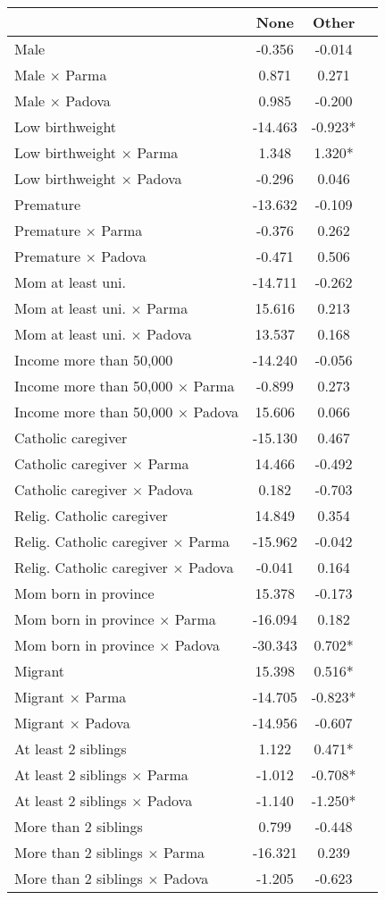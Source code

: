 \begin{tabular}{l c c c}
\toprule
& None & Other \\
\midrule
Male &    -0.356 &    -0.014 \\
Male $\times$ Parma &     0.871 &     0.271 \\
Male $\times$ Padova &     0.985 &    -0.200 \\
Low birthweight &   -14.463 & -0.923* \\
Low birthweight $\times$ Parma &     1.348 & 1.320* \\
Low birthweight $\times$ Padova &    -0.296 &     0.046 \\
Premature &   -13.632 &    -0.109 \\
Premature $\times$ Parma &    -0.376 &     0.262 \\
Premature $\times$ Padova &    -0.471 &     0.506 \\
Mom at least uni. &   -14.711 &    -0.262 \\
Mom at least uni. $\times$ Parma &    15.616 &     0.213 \\
Mom at least uni. $\times$ Padova &    13.537 &     0.168 \\
Income more than 50,000 &   -14.240 &    -0.056 \\
Income more than 50,000 $\times$ Parma &    -0.899 &     0.273 \\
Income more than 50,000 $\times$ Padova &    15.606 &     0.066 \\
Catholic caregiver &   -15.130 &     0.467 \\
Catholic caregiver $\times$ Parma &    14.466 &    -0.492 \\
Catholic caregiver $\times$ Padova &     0.182 &    -0.703 \\
Relig. Catholic caregiver &    14.849 &     0.354 \\
Relig. Catholic caregiver $\times$ Parma &   -15.962 &    -0.042 \\
Relig. Catholic caregiver $\times$ Padova &    -0.041 &     0.164 \\
Mom born in province &    15.378 &    -0.173 \\
Mom born in province $\times$ Parma &   -16.094 &     0.182 \\
Mom born in province $\times$ Padova &   -30.343 & 0.702* \\
Migrant &    15.398 & 0.516* \\
Migrant $\times$ Parma &   -14.705 & -0.823* \\
Migrant $\times$ Padova &   -14.956 &    -0.607 \\
At least 2 siblings &     1.122 & 0.471* \\
At least 2 siblings $\times$ Parma &    -1.012 & -0.708* \\
At least 2 siblings $\times$ Padova &    -1.140 & -1.250* \\
More than 2 siblings &     0.799 &    -0.448 \\
More than 2 siblings $\times$ Parma &   -16.321 &     0.239 \\
More than 2 siblings $\times$ Padova &    -1.205 &    -0.623 \\
\bottomrule
\end{tabular}

